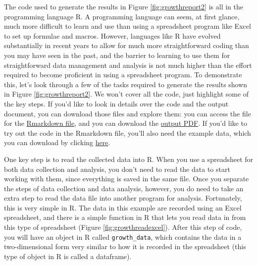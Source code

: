 \documentclass[]{tufte-book}
\begin{document}
The code used to generate the results in Figure \ref{fig:growthreport2} is all
in the programming language R. A programming language can seem, at first glance,
much more difficult to learn and use than using a spreadsheet program like Excel
to set up formulae and macros. However, languages like R have evolved
substantially in recent years to allow for much more straightforward coding than
you may have seen in the past, and the barrier to learning to use them for
straightforward data management and analysis is not much higher than the effort
required to become proficient in using a spreadsheet program. To demonstrate
this, let's look through a few of the tasks required to generate the results
shown in Figure \ref{fig:growthreport2}. We won't cover all the code, just
highlight some of the key steps. If you'd like to look in details over the code
and the output document, you can download those files and explore them: you can
access the file for the \href{https://github.com/geanders/improve_repro/blob/master/data/growth_curve_data_in_excel\%20(1)/Example_report.Rmd}{Rmarkdown
file},
and you can download the \href{https://github.com/geanders/improve_repro/raw/master/data/growth_curve_data_in_excel\%20(1)/Example_report.pdf}{output
PDF}.
If you'd like to try out the code in the Rmarkdown file, you'll also need the
example data, which you can download by clicking
\href{https://github.com/geanders/improve_repro/raw/master/data/growth_curve_data_in_excel\%20(1)/growth\%20curve\%20data_GR.xls}{here}.

One key step is to read the collected data into R. When you use a spreadsheet
for both data collection and analysis, you don't need to read the data to start
working with them, since everything is saved in the same file. Once you separate
the steps of data collection and data analysis, however, you do need to take an
extra step to read the data file into another program for analysis. Fortunately,
this is very simple in R. The data in this example are recorded using an Excel
spreadsheet, and there is a simple function in R that lets you read data in from
this type of spreadsheet (Figure \ref{fig:growthreadexcel}). After this step of
code, you will have an object in R called \texttt{growth\_data}, which contains the data
in a two-dimensional form very similar to how it is recorded in the spreadsheet
(this type of object in R is called a dataframe).
\end{document}
